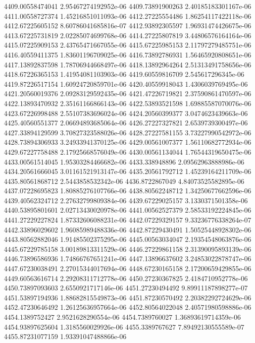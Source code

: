 {4409.00558474041 2.95467274192952e-06
4409.73891900263 2.40185183301167e-06
4411.00558727374 1.45216851011093e-06
4412.27225554486 1.86254117422118e-06
4412.67225605152 8.60786041685816e-07
4412.93892305597 1.96931474426675e-06
4413.67225731819 2.02285074699768e-06
4414.27225807819 3.44806576164164e-06
4415.07225909153 2.43765471667055e-06
4415.67225985153 2.11797279485751e-06
4416.40559411375 1.83601196709025e-06
4416.73892786931 1.56465920808651e-06
4417.13892837598 1.78706944668497e-06
4418.13892964264 2.51313491758656e-06
4418.67226365153 1.41954081103903e-06
4419.60559816709 2.545617296345e-06
4419.87226517154 1.60924720859701e-06
4420.40559918043 1.4306039769495e-06
4421.20560019376 2.09283129592435e-06
4421.47226719821 2.37590861470597e-06
4422.13893470932 2.35161166866143e-06
4422.53893521598 1.69885587070076e-06
4423.67226998488 2.55107383696024e-06
4424.20560399377 3.0474623439663e-06
4425.40560551377 2.06694893685064e-06
4426.27227327821 2.6539739300497e-06
4427.33894129599 3.70827323588026e-06
4428.27227581155 3.73227990542972e-06
4428.73894306933 3.24933941370125e-06
4429.00561007377 1.56110682772934e-06
4429.67227758488 2.17925668576049e-06
4430.00561134044 1.76544319650475e-06
4433.00561514045 1.95303284466682e-06
4433.338948896 2.09562963888986e-06
4434.20561666045 3.01161521913147e-06
4435.20561792712 1.45239164211709e-06
4435.80561868712 2.5443858532342e-06
4436.8722867049 4.84073525582895e-06
4437.07228695823 1.80885276107766e-06
4438.80562248712 1.34250677662596e-06
4439.40562324712 2.27632799809384e-06
4439.67229025157 3.1330371501358e-06
4440.53895801601 2.02713430020978e-06
4441.00562527379 2.58533192224845e-06
4441.27229227824 1.87332606088231e-06
4442.07229329157 9.33236776338264e-07
4442.33896029602 1.96085989488336e-06
4442.87229430491 1.50525448928302e-06
4443.80562882046 1.91485502375295e-06
4445.00563034047 2.19354548063876e-06
4445.67229785158 3.00189813311529e-06
4446.27229861158 2.31390095893139e-06
4446.73896586936 1.74866767651241e-06
4447.13896637602 3.24853022878747e-06
4447.67230038491 2.27015344017694e-06
4448.67230165158 2.17200659429855e-06
4449.60563616714 2.29208311712778e-06
4450.27230367825 2.4184710952778e-06
4450.73897093603 2.6550921717146e-06
4451.27230494492 9.89911187898277e-07
4451.53897194936 1.88682815549873e-06
4451.87230570492 2.20382292724629e-06
4452.47230646492 1.26125636957664e-06
4452.80564022048 2.40571980598886e-06
4454.1389752427 2.9521628290554e-06
4454.7389760027 1.36893619714359e-06
4454.93897625604 1.3185560029926e-06
4455.3389767627 7.89492130555589e-07
4455.87231077159 1.93391047488866e-06
}
